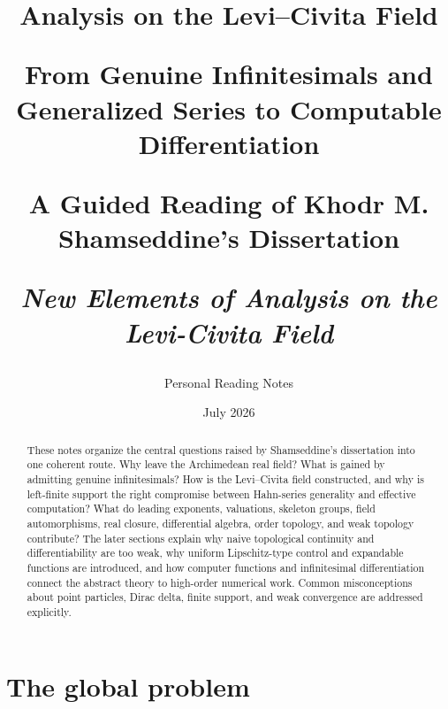 \documentclass[11pt,a4paper]{article}
\title{\bfseries\color{deepblue} Analysis on the Levi--Civita Field\par
\large From Genuine Infinitesimals and Generalized Series to Computable Differentiation\par
\vspace{0.4em}\normalsize A Guided Reading of Khodr M. Shamseddine's Dissertation\par
\textit{New Elements of Analysis on the Levi-Civita Field}}
\author{Personal Reading Notes}
\date{July 2026}
\theoremstyle{remark}
\begin{document}
\maketitle

\begin{center}
\end{center}

\begin{abstract}
These notes organize the central questions raised by Shamseddine's dissertation into one
coherent route. Why leave the Archimedean real field? What is gained by admitting genuine
infinitesimals? How is the Levi--Civita field constructed, and why is left-finite support the
right compromise between Hahn-series generality and effective computation? What do leading
exponents, valuations, skeleton groups, field automorphisms, real closure, differential
algebra, order topology, and weak topology contribute? The later sections explain why naive
topological continuity and differentiability are too weak, why uniform Lipschitz-type control
and expandable functions are introduced, and how computer functions and infinitesimal
differentiation connect the abstract theory to high-order numerical work. Common
misconceptions about point particles, Dirac delta, finite support, and weak convergence are
addressed explicitly.
\end{abstract}

\tableofcontents
\newpage

\section{The global problem}
\end{document}
